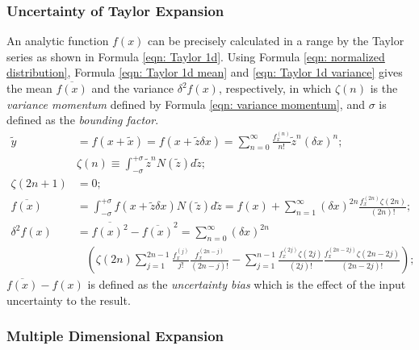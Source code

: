 \documentclass[twoside]{article}
\numberwithin{equation}{section}
\newcommand{\eqspace}{\;\;\;}
\begin{document}
\fi



\subsubsection{Uncertainty of Taylor Expansion}

An analytic function $f(x)$ can be precisely calculated in a range by the Taylor series as shown in Formula \eqref{eqn: Taylor 1d}.
Using Formula \eqref{eqn: normalized distribution}, Formula \eqref{eqn: Taylor 1d mean} and \eqref{eqn: Taylor 1d variance} \cite{Prev_Precision_Arithmetic} gives the mean $\overline{f(x)}$ and the variance $\delta^2 f(x)$, respectively, in which $\zeta(n)$ is the \emph{variance momentum} defined by Formula \eqref{eqn: variance momentum}, and $\sigma$ is defined as the \emph{bounding factor}.
\begin{align}
\label{eqn: Taylor 1d} 
\tilde{y} &= f(x + \tilde{x}) = f(x + \tilde{z} \delta x) = \sum_{n=0}^{\infty} \frac{f^{(n)}_x}{n!} \tilde{z}^n (\delta x)^n; \\
\label{eqn: variance momentum}
& \zeta(n) \equiv \int_{-\sigma}^{+\sigma} \tilde{z}^n N(\tilde{z}) d \tilde{z};\\
\label{eqn: variance momentum symmetry}
\zeta(2n+1) &= 0; \\
\label{eqn: Taylor 1d mean}
\overline{f(x)} &= \int_{-\sigma}^{+\sigma} f(x + \tilde{z} \delta x) N(\tilde{z}) d \tilde{z}
  = f(x) + \sum_{n=1}^{\infty}(\delta x)^{2n} \frac{f^{(2n)}_x \zeta(2n)}{(2n)!}; \\
\label{eqn: Taylor 1d variance}
\delta^2 f(x) &= \overline{f(x)^2} - \overline{f(x)}^2 = \sum_{n=0}^{\infty} (\delta x)^{2n} \\
&\eqspace \left( \zeta(2n) \sum_{j=1}^{2n-1} \frac{f^{(j)}_x}{j!} \frac{f^{(2n-j)}_x}{(2n-j)!} - 
 	\sum_{j=1}^{n-1} \frac{f^{(2j)}_x \zeta(2j)}{(2j)!} \frac{f^{(2n-2j)}_x \zeta(2n - 2j)}{(2n-2j)!} \right);  \nonumber
\end{align}
$\overline{f(x)} - f(x)$ is defined as the \emph{uncertainty bias} which is the effect of the input uncertainty to the result.


\subsubsection{Multiple Dimensional Expansion}
\end{document}
